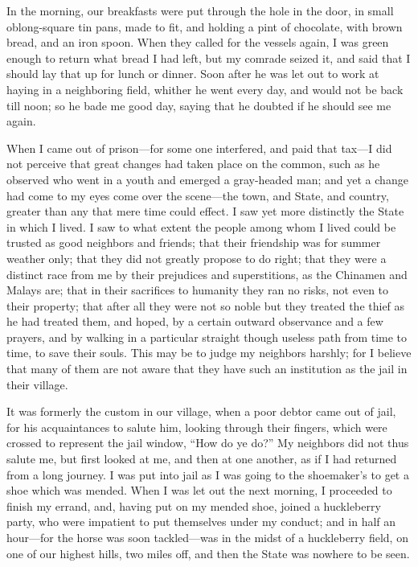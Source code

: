 \documentclass[12pt]{article}
\begin{document}
In the morning, our breakfasts were put through the hole in the door, in
small oblong-square tin pans, made to fit, and holding a pint of
chocolate, with brown bread, and an iron spoon. When they called for the
vessels again, I was green enough to return what bread I had left, but
my comrade seized it, and said that I should lay that up for lunch or
dinner. Soon after he was let out to work at haying in a neighboring
field, whither he went every day, and would not be back till noon; so he
bade me good day, saying that he doubted if he should see me again.

When I came out of prison---for some one interfered, and paid that
tax---I did not perceive that great changes had taken place on the
common, such as he observed who went in a youth and emerged a
gray-headed man; and yet a change had come to my eyes come over the
scene---the town, and State, and country, greater than any that mere
time could effect. I saw yet more distinctly the State in which I lived.
I saw to what extent the people among whom I lived could be trusted as
good neighbors and friends; that their friendship was for summer weather
only; that they did not greatly propose to do right; that they were a
distinct race from me by their prejudices and superstitions, as the
Chinamen and Malays are; that in their sacrifices to humanity they ran
no risks, not even to their property; that after all they were not so
noble but they treated the thief as he had treated them, and hoped, by a
certain outward observance and a few prayers, and by walking in a
particular straight though useless path from time to time, to save their
souls. This may be to judge my neighbors harshly; for I believe that
many of them are not aware that they have such an institution as the
jail in their village.

It was formerly the custom in our village, when a poor debtor came out
of jail, for his acquaintances to salute him, looking through their
fingers, which were crossed to represent the jail window, ``How do ye
do?'' My neighbors did not thus salute me, but first looked at me, and
then at one another, as if I had returned from a long journey. I was put
into jail as I was going to the shoemaker's to get a shoe which was
mended. When I was let out the next morning, I proceeded to finish my
errand, and, having put on my mended shoe, joined a huckleberry party,
who were impatient to put themselves under my conduct; and in half an
hour---for the horse was soon tackled---was in the midst of a
huckleberry field, on one of our highest hills, two miles off, and then
the State was nowhere to be seen.
\end{document}
